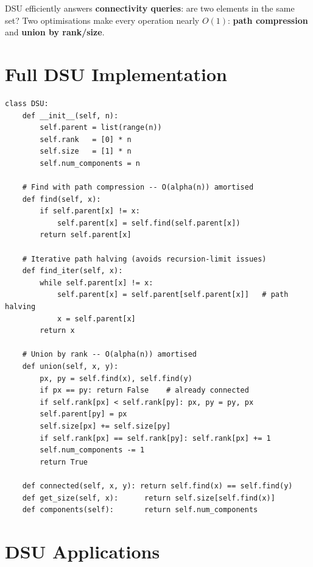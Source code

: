\documentclass[11pt,a4paper]{report}
\begin{document}
DSU efficiently answers \textbf{connectivity queries}: are two elements in the same set?
Two optimisations make every operation nearly $O(1)$: \textbf{path compression} and \textbf{union by rank/size}.

\section{Full DSU Implementation}

\begin{lstlisting}
class DSU:
    def __init__(self, n):
        self.parent = list(range(n))
        self.rank   = [0] * n
        self.size   = [1] * n
        self.num_components = n

    # Find with path compression -- O(alpha(n)) amortised
    def find(self, x):
        if self.parent[x] != x:
            self.parent[x] = self.find(self.parent[x])
        return self.parent[x]

    # Iterative path halving (avoids recursion-limit issues)
    def find_iter(self, x):
        while self.parent[x] != x:
            self.parent[x] = self.parent[self.parent[x]]   # path halving
            x = self.parent[x]
        return x

    # Union by rank -- O(alpha(n)) amortised
    def union(self, x, y):
        px, py = self.find(x), self.find(y)
        if px == py: return False    # already connected
        if self.rank[px] < self.rank[py]: px, py = py, px
        self.parent[py] = px
        self.size[px] += self.size[py]
        if self.rank[px] == self.rank[py]: self.rank[px] += 1
        self.num_components -= 1
        return True

    def connected(self, x, y): return self.find(x) == self.find(y)
    def get_size(self, x):      return self.size[self.find(x)]
    def components(self):       return self.num_components
\end{lstlisting}

\section{DSU Applications}
\end{document}
